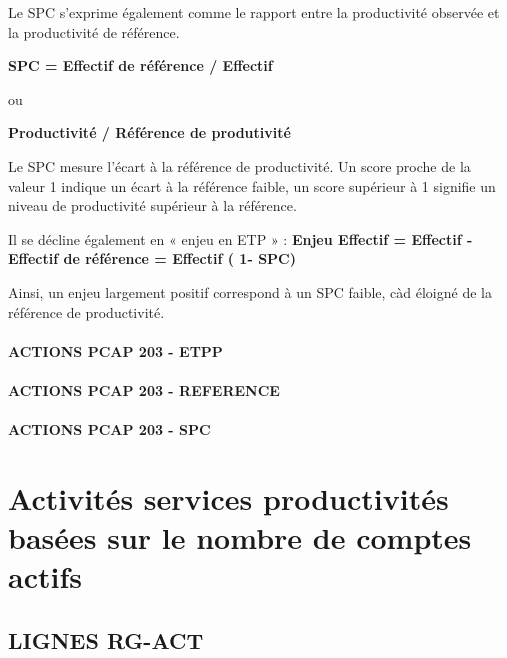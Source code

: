 \documentclass[
]{book}
\begin{document}
Le SPC s'exprime également comme le rapport entre la productivité observée et la productivité de référence.

\textbf{SPC = Effectif de référence / Effectif}

ou

\textbf{Productivité / Référence de produtivité}

Le SPC mesure l'écart à la référence de productivité. Un score proche de la valeur 1 indique un écart à la référence faible, un score supérieur à 1 signifie un niveau de productivité supérieur à la référence.

Il se décline également en « enjeu en ETP » :
\textbf{Enjeu Effectif = Effectif - Effectif de référence = Effectif ( 1- SPC)}

Ainsi, un enjeu largement positif correspond à un SPC faible, càd éloigné de la référence de productivité.

\hypertarget{actions-pcap-203---etpp}{%
\subsection{ACTIONS PCAP 203 - ETPP}\label{actions-pcap-203---etpp}}

\hypertarget{actions-pcap-203---reference}{%
\subsection{ACTIONS PCAP 203 - REFERENCE}\label{actions-pcap-203---reference}}

\hypertarget{actions-pcap-203---spc}{%
\subsection{ACTIONS PCAP 203 - SPC}\label{actions-pcap-203---spc}}

\hypertarget{part-activituxe9s-services-productivituxe9s-basuxe9es-sur-le-nombre-de-comptes-actifs-1}{%
\part{Activités services productivités basées sur le nombre de comptes actifs}\label{part-activituxe9s-services-productivituxe9s-basuxe9es-sur-le-nombre-de-comptes-actifs-1}}

\hypertarget{lignes-rg-act}{%
\chapter{LIGNES RG-ACT}\label{lignes-rg-act}}
\end{document}
